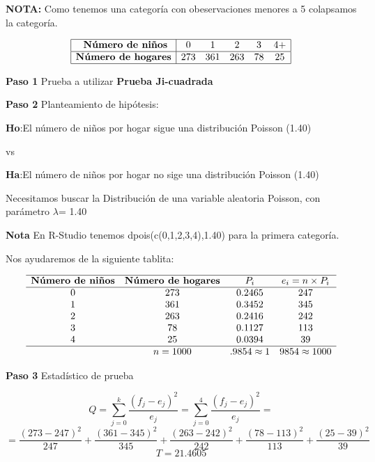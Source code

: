 \documentclass[a4paper,oneside,openany]{book}
\begin{document}
\textbf{NOTA:} Como tenemos una categoría con obeservaciones menores a 5
colapsamos la categoría.

\[
\begin{equation*}
\begin{array}{|c |c c c c c|}
\hline
\textbf{  Número de niños} &0 &1 &2& 3&4+  \\
\hline
\textbf{Número de hogares} & 273& 361&263 &78 & 25  \\
\hline
\end{array}
\end{equation*}
 \]

\textbf{Paso 1} Prueba a utilizar \textbf{Prueba Ji-cuadrada}

\textbf{Paso 2} Planteamiento de hipótesis:

\textbf{Ho}:El número de niños por hogar sigue una distribución Poisson
(1.40)

vs

\textbf{Ha}:El número de niños por hogar no sige una distribución
Poisson (1.40)

Necesitamos buscar la Distribución de una variable aleatoria Poisson,
con parámetro \(\lambda\)= 1.40

\textbf{Nota} En R-Studio tenemos dpois(c(0,1,2,3,4),1.40) para la
primera categoría.

Nos ayudaremos de la siguiente tablita:

\[
\begin{equation*}
\begin{array}{c c c c c}
\hline
\textbf{Número de niños} & \textbf{Número de hogares} & P_{i} & e_i=n \times P_i \\
\hline
0&273&0.2465&247 \\
1&361&0.3452&345 \\
2&263&0.2416&242 \\
3&78&0.1127&113 \\
4&25&0.0394&39 \\
\hline
&n=1000&.9854\approx1 &9854\approx1000 \\
\end{array}
\end{equation*}
\]

\textbf{Paso 3} Estadístico de prueba

\[Q=\sum_{j=0}^{k}\frac{(f_{j}-e_{j})^2}{e_{j}}=\sum_{j=0}^{4}\frac{(f_{j}-e_{j})^2}{e_{j}}=\]
\[=\frac{(273-247)^2}{247}+\frac{(361-345)^2}{345}+\frac{(263-242)^2}{242}+\frac{(78-113)^2}{113}+\frac{(25-39)^2}{39}\]
\[T=21.4605\]
\end{document}
